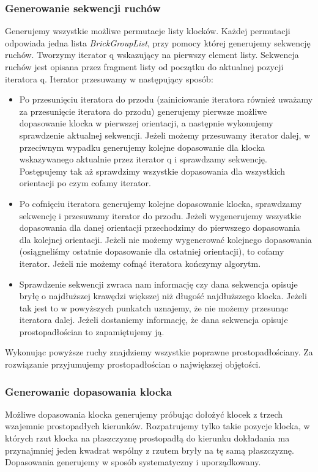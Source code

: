 \documentclass[12pt]{article}
\begin{document}
\subsubsection{Generowanie sekwencji ruchów}
Generujemy wszystkie możliwe permutacje listy klocków. Każdej permutacji odpowiada jedna lista \textit{BrickGroupList},
przy pomocy której generujemy sekwencję ruchów. Tworzymy iterator q wskazujący na pierwszy element listy. 
Sekwencja ruchów jest opisana przez fragment listy od początku do aktualnej pozycji iteratora q.
Iterator przesuwamy w następujący sposób:
\begin{itemize}
 \item Po przesunięciu iteratora do przodu (zainiciowanie iteratora również uważamy za przesunięcie iteratora do przodu)
generujemy pierwsze możliwe dopasowanie klocka w pierwszej orientacji, a następnie
wykonujemy sprawdzenie aktualnej sekwencji. Jeżeli możemy przesuwamy iterator dalej, w przeciwnym wypadku generujemy kolejne
dopasowanie dla klocka wskazywanego aktualnie przez iterator q i sprawdzamy sekwencję. Postępujemy tak aż sprawdzimy
wszystkie dopasowania dla wszystkich orientacji po czym cofamy iterator.
 \item Po cofnięciu iteratora generujemy kolejne dopasowanie klocka, sprawdzamy sekwencję i przesuwamy iterator do przodu.
 Jeżeli wygenerujemy wszystkie dopasowania dla danej orientacji przechodzimy do pierwszego dopasowania dla kolejnej orientacji.
 Jeżeli nie możemy wygenerować kolejnego dopasowania (osiągneliśmy ostatnie dopasowanie dla ostatniej orientacji), to 
 cofamy iterator. Jeżeli nie możemy cofnąć iteratora kończymy algorytm.
 \item Sprawdzenie sekwencji zwraca nam informację czy dana sekwencja opisuje bryłę o najdłuższej krawędzi większej niż
długość najdłuższego klocka. Jeżeli tak jest to w powyższych punkatch uznajemy, że nie możemy przesunąc iteratora dalej.
Jeżeli dostaniemy informację, że dana sekwencja opisuje prostopadłościan to zapamiętujemy ją.
 \end{itemize}
Wykonując powyższe ruchy znajdziemy wszystkie poprawne prostopadłościany. Za rozwiązanie przyjumujemy prostopadłościan o
największej objętości.
\subsubsection{Generowanie dopasowania klocka}
Możliwe dopasowania klocka generujemy próbując dołożyć klocek z trzech wzajemnie prostopadłych kierunków. Rozpatrujemy
tylko takie pozycje klocka, w których rzut  klocka na płaszczyznę prostopadłą do kierunku dokładania ma przynajmniej 
jeden kwadrat wspólny z rzutem bryły na tę samą płaszczyznę. Dopasowania generujemy w sposób systematyczny i uporządkowany.
\end{document}
